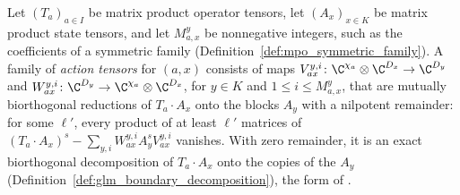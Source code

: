\begin{definition}%
    \label{def:mpoalg_action_tensors}
    \leanok
    Let $(T_a)_{a\in I}$ be matrix product operator tensors, let
    $(A_x)_{x\in K}$ be matrix product state tensors, and let $M_{a,x}^y$ be
    nonnegative integers, such as the coefficients of a symmetric family
    (Definition~\ref{def:mpo_symmetric_family}). A family of
    \emph{action tensors} for $(a,x)$ consists of maps
    $V_{ax}^{y,i}\colon\C^{\chi_a}\otimes\C^{D_x}\to\C^{D_y}$ and
    $W_{ax}^{y,i}\colon\C^{D_y}\to\C^{\chi_a}\otimes\C^{D_x}$, for $y\in K$
    and $1\leq i\leq M_{a,x}^y$, that are mutually biorthogonal reductions of
    $T_a\cdot A_x$ onto the blocks $A_y$ with a nilpotent remainder: for some
    $\ell'$, every product of at least $\ell'$ matrices of
    $(T_a\cdot A_x)^s-\sum_{y,i}W_{ax}^{y,i}A_y^sV_{ax}^{y,i}$ vanishes.
    With zero remainder, it is an exact biorthogonal decomposition of
    $T_a\cdot A_x$ onto the copies of the $A_y$
    (Definition~\ref{def:glm_boundary_decomposition}), the form of
    \cite[Section~3]{GarreRubio2023MPOSym}.
\end{definition}

